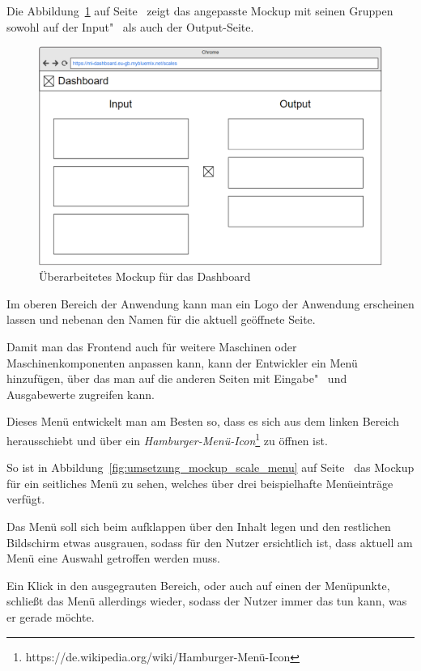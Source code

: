 Die Abbildung~\ref{fig:umsetzung_mockup_scale_2} auf Seite~\pageref{fig:umsetzung_mockup_scale_2} zeigt das angepasste
Mockup mit seinen Gruppen sowohl auf der Input"~ als auch der Output-Seite.

\begin{figure}[h]
    \centering
    \includegraphics[width=\textwidth]{images/kapitel_4/mockup_scale_2.png}
    \caption{Überarbeitetes Mockup für das Dashboard}
    \label{fig:umsetzung_mockup_scale_2}
\end{figure}

Im oberen Bereich der Anwendung kann man ein Logo der Anwendung erscheinen lassen und nebenan den Namen für die aktuell
geöffnete Seite.

Damit man das Frontend auch für weitere Maschinen oder Maschinenkomponenten anpassen kann, kann der Entwickler ein Menü
hinzufügen, über das man auf die anderen Seiten mit Eingabe"~ und Ausgabewerte zugreifen kann.

Dieses Menü entwickelt man am Besten so, dass es sich aus dem linken Bereich herausschiebt und über ein
\textit{Hamburger-Menü-Icon}\footnote{https://de.wikipedia.org/wiki/Hamburger-Menü-Icon} zu öffnen ist.

So ist in Abbildung~\ref{fig:umsetzung_mockup_scale_menu} auf Seite~\pageref{fig:umsetzung_mockup_scale_menu} das Mockup
für ein seitliches Menü zu sehen, welches über drei beispielhafte Menüeinträge verfügt.

Das Menü soll sich beim aufklappen über den Inhalt legen und den restlichen Bildschirm etwas ausgrauen, sodass für den
Nutzer ersichtlich ist, dass aktuell am Menü eine Auswahl getroffen werden muss.

Ein Klick in den ausgegrauten Bereich, oder auch auf einen der Menüpunkte, schließt das Menü allerdings wieder, sodass
der Nutzer immer das tun kann, was er gerade möchte.

